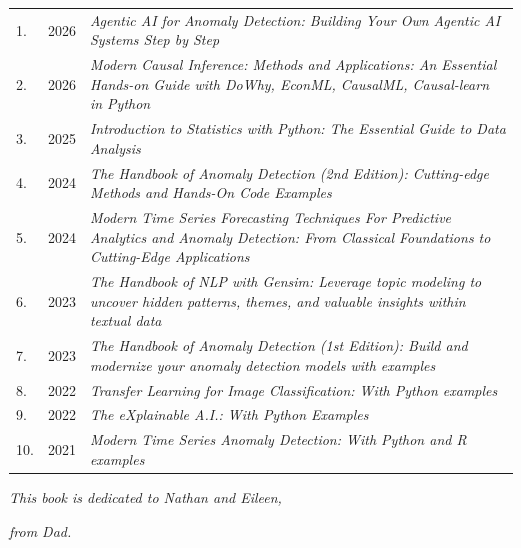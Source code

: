\renewcommand{\arraystretch}{1.4}
\begin{tabular}{p{0.2cm}p{0.8cm}p{15cm}}
1. & 2026 & \textit{Agentic AI for Anomaly Detection: Building Your Own Agentic AI Systems Step by Step} \\
2. & 2026 & \textit{Modern Causal Inference: Methods and Applications: An Essential Hands-on Guide with DoWhy, EconML, CausalML, Causal-learn in Python} \\
3. & 2025 & \textit{Introduction to Statistics with Python: The Essential Guide to Data Analysis} \\
4. & 2024 & \textit{The Handbook of Anomaly Detection (2nd Edition): Cutting-edge Methods and Hands-On Code Examples} \\
5. & 2024 & \textit{Modern Time Series Forecasting Techniques For Predictive Analytics and Anomaly Detection: From Classical Foundations to Cutting-Edge Applications} \\
6. & 2023 & \textit{The Handbook of NLP with Gensim: Leverage topic modeling to uncover hidden patterns, themes, and valuable insights within textual data} \\
7. & 2023 & \textit{The Handbook of Anomaly Detection (1st Edition): Build and modernize your anomaly detection models with examples} \\
8. & 2022 & \textit{Transfer Learning for Image Classification: With Python examples} \\
9. & 2022 & \textit{The eXplainable A.I.: With Python Examples} \\
10. & 2021 & \textit{Modern Time Series Anomaly Detection: With Python and R examples} \\
\end{tabular}



\newpage
\vspace*{\fill}

\begin{center}
\textit{This book is dedicated to Nathan and Eileen,}
\end{center}

\begin{center}
\textit{from Dad.}
\end{center}


\vspace*{2cm}

\noindent\makebox[\linewidth]{\rule{\textwidth}{1pt}}

\noindent\makebox[\linewidth]{\rule{\textwidth}{1pt}}



\vspace*{\fill}


